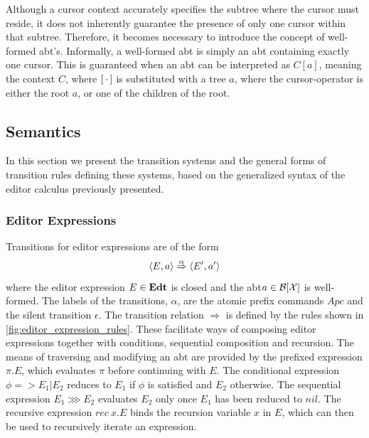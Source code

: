 \documentclass[sigplan,review]{acmart}
\newcommand{\abt}{\textsf{abt}\xspace}
\begin{document}
Although a cursor context accurately specifies the subtree where the
cursor must reside, it does not inherently guarantee the presence of
only one cursor within that subtree. Therefore, it becomes necessary
to introduce the concept of well-formed {\abt}'s. Informally, a
well-formed \abt is simply an \abt containing exactly one cursor. This
is guaranteed when an \abt can be interpreted as $C[a]$, meaning
the context $C$, where $[ \, \cdot \, ]$ is substituted with a tree $a$,
where the cursor-operator is either the root $a$, or one of the
children of the root. 


\subsection{Semantics}

In this section we present the transition systems and the general
forms of transition rules defining these systems, based on the
generalized syntax of the editor calculus previously presented.  

\subsubsection{Editor Expressions} \label{sec:Semantics}

Transitions for editor expressions are of the form
\[ \langle E, a \rangle \stackrel{\alpha}{\Rightarrow} \langle E', a' \rangle \]
where the editor expression
$E \in \textbf{Edt}$ is closed and the \abt $a \in \mathcal{B}[\mathcal{X} ]$ is well-formed. The
labels of the transitions, $\alpha$, are the atomic prefix commands
$Apc$ and the silent transition $\epsilon$. The transition relation
$\Rightarrow$ is defined by the rules shown in
\cref{fig:editor_expression_rules}. These facilitate ways of composing
editor expressions together with conditions, sequential composition
and recursion. The means of traversing and modifying an \abt are
provided by the prefixed expression $\pi.E$, which evaluates $\pi$
before continuing with $E$. The conditional expression
$\phi => E_1|E_2$ reduces to $E_1$ if $\phi$ is satisfied and $E_2$
otherwise. The sequential expression $E_1 \ggg E_2$ evaluates $E_2$
only once $E_1$ has been reduced to $nil$. The recursive expression
$rec \ x.E$ binds the recursion variable $x$ in $E$, which can then be
used to recursively iterate an expression.
\end{document}
